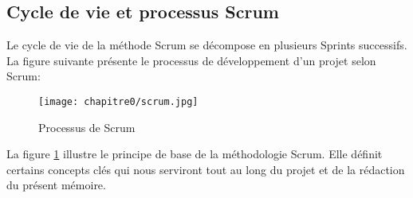 \subsection{Cycle de vie et processus Scrum}

Le cycle de vie de la méthode Scrum se décompose en plusieurs Sprints successifs. La figure suivante présente le processus de développement d'un projet selon Scrum:

\begin{figure}[H]
\centering
\texttt{[image: chapitre0/scrum.jpg]}
\caption{Processus de Scrum}
\label{fig:scrum-process}
\end{figure}

La figure \ref{fig:scrum-process} illustre le principe de base de la méthodologie Scrum. Elle définit certains concepts clés qui nous serviront tout au long du projet et de la rédaction du présent mémoire.\\

